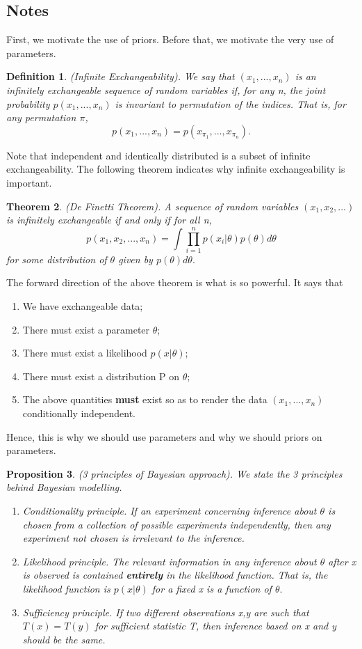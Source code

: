 \documentclass[twoside]{article}
\newcounter{lecnum}
\newtheorem{theorem}{Theorem}[lecnum]
\newtheorem{proposition}[theorem]{Proposition}
\newtheorem{definition}[theorem]{Definition}
\begin{document}
\subsection{Notes}
First, we motivate the use of priors. Before that, we motivate the very use of parameters.
\begin{definition}(Infinite Exchangeability). We say that $(x_1,...,x_n)$ is an infinitely exchangeable sequence of random variables if, for any n, the joint probability $p(x_1,...,x_n)$ is invariant to permutation of the indices. That is, for any permutation $\pi$,
$$
p(x_1,...,x_n) = p(x_{\pi_{1}},...,x_{\pi_{n}}).
$$
\end{definition}

Note that independent and identically distributed is a subset of infinite exchangeability. The following theorem indicates why infinite exchangeability is important.

\begin{theorem}(De Finetti Theorem). A sequence of random variables $(x_1,x_2,...)$ is infinitely exchangeable if and only if for all n,
$$
p(x_1,x_2,...,x_n) = \int \prod_{i=1}^{n}p(x_i|\theta)p(\theta)d\theta
$$
for some distribution of $\theta$ given by $p(\theta)d\theta.$
\end{theorem}

The forward direction of the above theorem is what is so powerful. It says that 
\begin{enumerate}
\item We have exchangeable data;
\item There must exist a parameter $\theta$;
\item There must exist a likelihood $p(x|\theta);$
\item There must exist a distribution P on $\theta;$
\item The above quantities \textbf{must} exist so as to render the data $(x_1,...,x_n)$ conditionally independent.
\end{enumerate}

Hence, this is why we should use parameters and why we should priors on parameters.

\begin{proposition}(3 principles of Bayesian approach). We state the 3 principles behind Bayesian modelling.
\begin{enumerate}
\item Conditionality principle. If an experiment concerning inference about $\theta$ is chosen from a collection of possible experiments independently, then any experiment not chosen is irrelevant to the inference.
\item Likelihood principle. The relevant information in any inference about $\theta$ after x is observed is contained \textbf{entirely} in the likelihood function. That is, the likelihood function is $p(x|\theta)$ for a fixed x is a function of $\theta.$
\item Sufficiency principle. If two different observations x,y are such that $T(x) = T(y)$ for sufficient statistic T, then inference based on x and y should be the same.
\end{enumerate}
\end{proposition}
\end{document}
